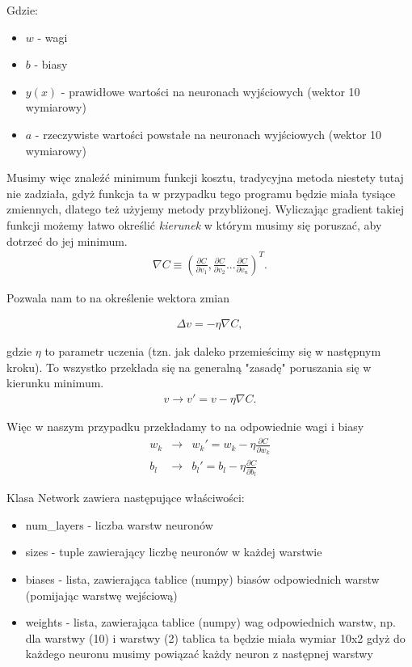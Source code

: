 \documentclass{article}
\begin{document}
Gdzie:
\begin{itemize}
    \item $w$ - wagi
    \item $b$ - biasy
    \item $y(x)$ - prawidłowe wartości na neuronach wyjściowych (wektor 10 wymiarowy)
    \item $a$ - rzeczywiste wartości powstałe na neuronach wyjściowych (wektor 10 wymiarowy) 
\end{itemize}
Musimy więc znaleźć minimum funkcji kosztu, tradycyjna metoda niestety tutaj nie zadziała, gdyż funkcja ta w przypadku tego programu będzie miała tysiące zmiennych,
dlatego też użyjemy metody przybliżonej. Wyliczając gradient takiej funkcji możemy łatwo określić \textit{kierunek} w którym musimy się poruszać, aby dotrzeć do jej minimum.
\begin{eqnarray} 
    \nabla C \equiv \left( \frac{\partial C}{\partial v_1}, 
    \frac{\partial C}{\partial v_2} ... \frac{\partial C}{\partial v_n} \right)^T.
\end{eqnarray}

\pagebreak
Pozwala nam to na określenie wektora zmian

\begin{eqnarray} 
    \Delta v = -\eta \nabla C,
\end{eqnarray}

gdzie $\eta$ to parametr uczenia (tzn. jak daleko przemieścimy się w następnym kroku). To wszystko przekłada się na generalną "zasadę" poruszania się w kierunku minimum.
\begin{eqnarray}
    v \rightarrow v' = v-\eta \nabla C.
\end{eqnarray}

Więc w naszym przypadku przekładamy to na odpowiednie wagi i biasy 
\begin{eqnarray}
    w_k & \rightarrow & w_k' = w_k-\eta \frac{\partial C}{\partial w_k} \\
    b_l & \rightarrow & b_l' = b_l-\eta \frac{\partial C}{\partial b_l}
\end{eqnarray}


Klasa Network zawiera następujące właściwości:
\begin{itemize}
    \item num\_layers - liczba warstw neuronów
    \item sizes - tuple zawierający liczbę neuronów w każdej warstwie
    \item biases - lista, zawierająca tablice (numpy) biasów odpowiednich warstw (pomijając warstwę wejściową)
    \item weights - lista, zawierająca tablice (numpy) wag odpowiednich warstw, np. dla warstwy (10) i warstwy (2) tablica ta będzie miała wymiar 10x2 gdyż do każdego neuronu
    musimy powiązać każdy neuron z następnej warstwy
\end{itemize}
\end{document}
